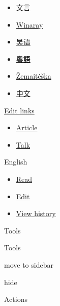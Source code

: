 \documentclass[
]{article}
\providecommand{\tightlist}{%
  \setlength{\itemsep}{0pt}\setlength{\parskip}{0pt}}
\begin{document}
\begin{itemize}
\item
  \href{https://zh-classical.wikipedia.org/wiki/\%E7\%84\%A6\%E8\%80\%B3}{{文言}}
\item
  \href{https://war.wikipedia.org/wiki/Joule}{{Winaray}}
\item
  \href{https://wuu.wikipedia.org/wiki/\%E7\%84\%A6\%E8\%80\%B3}{{吴语}}
\item
  \href{https://zh-yue.wikipedia.org/wiki/\%E7\%84\%A6\%E8\%80\%B3}{{粵語}}
\item
  \href{https://bat-smg.wikipedia.org/wiki/D\%C5\%BEaul\%C4\%97s}{{Žemaitėška}}
\item
  \href{https://zh.wikipedia.org/wiki/\%E7\%84\%A6\%E8\%80\%B3}{{中文}}
\end{itemize}

{\href{https://www.wikidata.org/wiki/Special:EntityPage/Q25269\#sitelinks-wikipedia}{Edit
links}}

\label{left-navigation}
\label{p-associated-pages}
\begin{itemize}
\tightlist
\item
  \label{ca-nstab-main}{\href{/wiki/Joule}{{Article}}}
\item
  \label{ca-talk}{\href{/wiki/Talk:Joule}{{Talk}}}
\end{itemize}

\label{p-variants}
{English}

\label{p-variants}

\label{right-navigation}
\label{p-views}
\begin{itemize}
\tightlist
\item
  \label{ca-view}{\href{/wiki/Joule}{{Read}}}
\item
  \label{ca-edit}{\href{/w/index.php?title=Joule&action=edit}{{Edit}}}
\item
  \label{ca-history}{\href{/w/index.php?title=Joule&action=history}{{View
  history}}}
\end{itemize}

\label{vector-page-tools-dropdown}
{Tools}

\label{vector-page-tools-unpinned-container}
\label{vector-page-tools}
Tools

move to sidebar

hide

\label{p-cactions}
Actions
\end{document}
